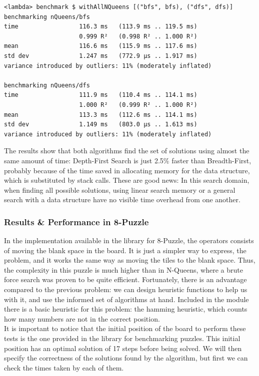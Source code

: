 \begin{lstlisting}
<lambda> benchmark $ withAllNQueens [("bfs", bfs), ("dfs", dfs)]
benchmarking nQueens/bfs
time                 116.3 ms   (113.9 ms .. 119.5 ms)
                     0.999 R²   (0.998 R² .. 1.000 R²)
mean                 116.6 ms   (115.9 ms .. 117.6 ms)
std dev              1.247 ms   (772.9 µs .. 1.917 ms)
variance introduced by outliers: 11% (moderately inflated)

benchmarking nQueens/dfs
time                 111.9 ms   (110.4 ms .. 114.1 ms)
                     1.000 R²   (0.999 R² .. 1.000 R²)
mean                 113.3 ms   (112.6 ms .. 114.1 ms)
std dev              1.149 ms   (803.0 µs .. 1.613 ms)
variance introduced by outliers: 11% (moderately inflated)
\end{lstlisting}

The results show that both algorithms find the set of solutions using almost
the same amount of time: Depth-First Search is just 2.5\% faster than
Breadth-First, probably because of the time saved in allocating memory for the
data structure, which is substituted by stack calls. These are good news: In
this search domain, when finding all possible solutions, using linear search
memory or a general search with a data structure have no visible time overhead
from one another.\\

\subsubsection{Results \& Performance in 8-Puzzle}

In the implementation available in the library for 8-Puzzle, the operators
consists of moving the blank space in the board. It is just a simpler way to
express, the problem, and it works the same way as moving the tiles to the
blank space. Thus, the complexity in this puzzle is much higher than in
N-Queens, where a brute force search was proven to be quite efficient.
Fortunately, there is an advantage compared to the previous problem: we can
design heuristic functions to help us with it, and use the informed set of
algorithms at hand. Included in the module there is a basic heuristic for this
problem: the hamming heuristic, which counts how many numbers are not in the
correct position.\\

It is important to notice that the initial position of the board to perform
these tests is the one provided in the library for benchmarking puzzles. This
initial position has an optimal solution of 17 steps before being solved. We
will then specify the correctness of the solutions found by the algorithm, but
first we can check the times taken by each of them.\\

